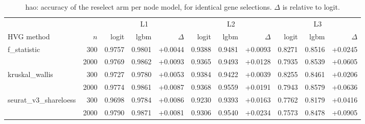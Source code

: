 \begin{table}[t]
\centering
\small
\begin{tabular}{lrrrrrrrrrr}
\toprule
 &  & \multicolumn{3}{c}{L1} & \multicolumn{3}{c}{L2} & \multicolumn{3}{c}{L3} \\
\cmidrule(lr){3-5}\cmidrule(lr){6-8}\cmidrule(lr){9-11}
HVG method & $n$ & logit & lgbm & $\Delta$ & logit & lgbm & $\Delta$ & logit & lgbm & $\Delta$ \\
\midrule
f\_statistic & 300 & 0.9757 & 0.9801 & +0.0044 & 0.9388 & 0.9481 & +0.0093 & 0.8271 & 0.8516 & +0.0245 \\
 & 2000 & 0.9769 & 0.9862 & +0.0093 & 0.9365 & 0.9493 & +0.0128 & 0.7935 & 0.8539 & +0.0605 \\
\addlinespace
kruskal\_wallis & 300 & 0.9727 & 0.9780 & +0.0053 & 0.9384 & 0.9422 & +0.0039 & 0.8255 & 0.8461 & +0.0206 \\
 & 2000 & 0.9774 & 0.9861 & +0.0087 & 0.9368 & 0.9559 & +0.0191 & 0.7943 & 0.8579 & +0.0636 \\
\addlinespace
seurat\_v3\_shareloess & 300 & 0.9698 & 0.9784 & +0.0086 & 0.9230 & 0.9393 & +0.0163 & 0.7762 & 0.8179 & +0.0416 \\
 & 2000 & 0.9790 & 0.9871 & +0.0081 & 0.9306 & 0.9540 & +0.0234 & 0.7573 & 0.8478 & +0.0905 \\
\bottomrule
\end{tabular}
\caption{hao: accuracy of the reselect arm per node model, for identical gene selections. $\Delta$ is relative to logit.}
\label{tab:backend-hao-accuracy}
\end{table}